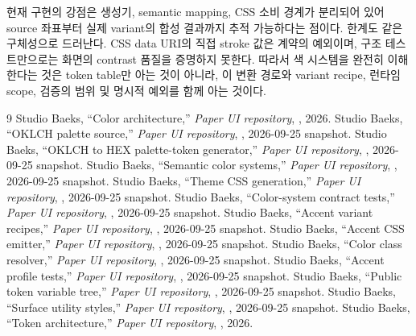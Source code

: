 \documentclass[11pt,titlepage]{article}
\begin{document}
현재 구현의 강점은 생성기, semantic mapping, CSS 소비 경계가 분리되어 있어 source 좌표부터 실제 variant의 합성 결과까지 추적 가능하다는 점이다. 한계도 같은 구체성으로 드러난다. CSS data URI의 직접 stroke 값은 계약의 예외이며, 구조 테스트만으로는 화면의 contrast 품질을 증명하지 못한다. 따라서 색 시스템을 완전히 이해한다는 것은 token table만 아는 것이 아니라, 이 변환 경로와 variant recipe, 런타임 scope, 검증의 범위 및 명시적 예외를 함께 아는 것이다.

\begin{thebibliography}{9}
 Studio Baeks, ``Color architecture,'' \textit{Paper UI repository}, , 2026.
 Studio Baeks, ``OKLCH palette source,'' \textit{Paper UI repository}, , 2026-09-25 snapshot.
 Studio Baeks, ``OKLCH to HEX palette-token generator,'' \textit{Paper UI repository}, , 2026-09-25 snapshot.
 Studio Baeks, ``Semantic color systems,'' \textit{Paper UI repository}, , 2026-09-25 snapshot.
 Studio Baeks, ``Theme CSS generation,'' \textit{Paper UI repository}, , 2026-09-25 snapshot.
 Studio Baeks, ``Color-system contract tests,'' \textit{Paper UI repository}, , 2026-09-25 snapshot.
 Studio Baeks, ``Accent variant recipes,'' \textit{Paper UI repository}, , 2026-09-25 snapshot.
 Studio Baeks, ``Accent CSS emitter,'' \textit{Paper UI repository}, , 2026-09-25 snapshot.
 Studio Baeks, ``Color class resolver,'' \textit{Paper UI repository}, , 2026-09-25 snapshot.
 Studio Baeks, ``Accent profile tests,'' \textit{Paper UI repository}, , 2026-09-25 snapshot.
 Studio Baeks, ``Public token variable tree,'' \textit{Paper UI repository}, , 2026-09-25 snapshot.
 Studio Baeks, ``Surface utility styles,'' \textit{Paper UI repository}, , 2026-09-25 snapshot.
 Studio Baeks, ``Token architecture,'' \textit{Paper UI repository}, , 2026.
\end{thebibliography}
\end{document}
